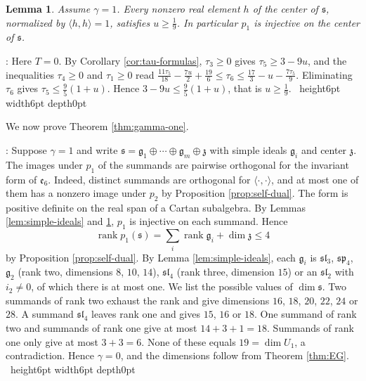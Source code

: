 \documentclass[leqno]{article}
\renewcommand{\leq}{\ensuremath{\leqslant}}
\renewcommand{\geq}{\ensuremath{\geqslant}}
\newcommand{\qed}{\hfill \vrule height6pt  width6pt depth0pt}
\newtheorem{lemma}[thm]{Lemma}
\newenvironment{proof}[1][]{\noindent {\it Proof #1} : }{\hbox{~}\qed
\smallskip
}
\numberwithin{equation}{section}
\begin{document}
\begin{lemma}
\label{lem:centre}
Assume $\gamma = 1$. Every nonzero real element $h$ of the center of $\mathfrak s$, normalized by $\langle h,h\rangle = 1$, satisfies $u \geq \frac19$. In particular $p_1$ is injective on the center of $\mathfrak s$.
\end{lemma}

\begin{proof}
Here $T = 0$. By Corollary \ref{cor:tau-formulas}, $\tau_3 \geq 0$ gives $\tau_5 \geq 3-9u$, and the inequalities $\tau_4 \geq 0$ and $\tau_1 \geq 0$ read $\frac{11\tau_5}{18}-\frac{7u}{2}+\frac{19}{6} \leq \tau_6 \leq \frac{17}{3}-u-\frac{7\tau_5}{9}$. Eliminating $\tau_6$ gives $\tau_5 \leq \frac95(1+u)$. Hence $3-9u \leq \frac95(1+u)$, that is $u \geq \frac19$.
\end{proof}

We now prove Theorem \ref{thm:gamma-one}.

\begin{proof}
Suppose $\gamma = 1$ and write $\mathfrak s = \mathfrak g_1 \oplus \cdots \oplus \mathfrak g_m \oplus \mathfrak z$ with simple ideals $\mathfrak g_i$ and center $\mathfrak z$. The images under $p_1$ of the summands are pairwise orthogonal for the invariant form of $\mathfrak e_6$. Indeed, distinct summands are orthogonal for $\langle\cdot,\cdot\rangle$, and at most one of them has a nonzero image under $p_2$ by Proposition \ref{prop:self-dual}. The form is positive definite on the real span of a Cartan subalgebra. By Lemmas \ref{lem:simple-ideals} and \ref{lem:centre}, $p_1$ is injective on each summand. Hence
\[
\operatorname{rank}p_1(\mathfrak s) = \sum_{i}\operatorname{rank}\mathfrak g_i+\dim \mathfrak z \leq 4
\]
by Proposition \ref{prop:self-dual}. By Lemma \ref{lem:simple-ideals}, each $\mathfrak g_i$ is $\mathfrak{sl}_3$, $\mathfrak{sp}_4$, $\mathfrak g_2$ (rank two, dimensions $8$, $10$, $14$), $\mathfrak{sl}_4$ (rank three, dimension $15$) or an $\mathfrak{sl}_2$ with $i_2 \neq 0$, of which there is at most one. We list the possible values of $\dim \mathfrak s$. Two summands of rank two exhaust the rank and give dimensions $16$, $18$, $20$, $22$, $24$ or $28$. A summand $\mathfrak{sl}_4$ leaves rank one and gives $15$, $16$ or $18$. One summand of rank two and summands of rank one give at most $14+3+1 = 18$. Summands of rank one only give at most $3+3 = 6$. None of these equals $19 = \dim U_1$, a contradiction. Hence $\gamma = 0$, and the dimensions follow from Theorem \ref{thm:EG}.
\end{proof}
\end{document}
